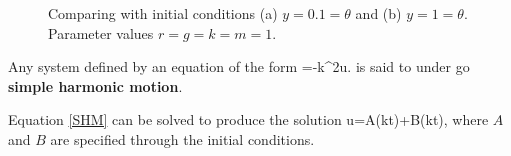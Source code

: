 \begin{figure}[!!!h!!!tb]
\centering
{}
\caption{\label{Different_ICs}Comparing  with initial conditions (a) $y=0.1=\theta$ and (b) $y=1=\theta$. Parameter values $r=g=k=m=1$.}
\end{figure}

\begin{defin}
Any system defined by an equation of the form
\bb
{}=-k^2u.\label{SHM}
\ee
is said to under go \textbf{simple harmonic motion}.
\end{defin}
Equation \ref{SHM} can be solved to produce the solution
\bb
u=A\cos(kt)+B\sin(kt),
\ee
where $A$ and $B$ are specified through the initial conditions.


